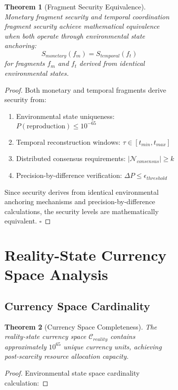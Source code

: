 \documentclass[12pt,a4paper]{article}
\newtheorem{theorem}{Theorem}
\begin{document}
\begin{figure}[H]
\begin{figure}[H]
\begin{theorem}[Fragment Security Equivalence]
Monetary fragment security and temporal coordination fragment security achieve mathematical equivalence when both operate through environmental state anchoring:
\begin{equation}
S_{monetary}(f_m) = S_{temporal}(f_t)
\end{equation}
for fragments $f_m$ and $f_t$ derived from identical environmental states.
\end{theorem}

\begin{proof}
Both monetary and temporal fragments derive security from:
\begin{enumerate}
\item Environmental state uniqueness: $P(\text{reproduction}) \leq 10^{-65}$
\item Temporal reconstruction windows: $\tau \in [t_{min}, t_{max}]$
\item Distributed consensus requirements: $|\mathcal{N}_{consensus}| \geq k$
\item Precision-by-difference verification: $\Delta P \leq \epsilon_{threshold}$
\end{enumerate}

Since security derives from identical environmental anchoring mechanisms and precision-by-difference calculations, the security levels are mathematically equivalent. $\square$
\end{proof}

\section{Reality-State Currency Space Analysis}

\subsection{Currency Space Cardinality}

\begin{theorem}[Currency Space Completeness]
The reality-state currency space $\mathcal{C}_{reality}$ contains approximately $10^{65}$ unique currency units, achieving post-scarcity resource allocation capacity.
\end{theorem}

\begin{proof}
Environmental state space cardinality calculation:


\end{proof}
\end{figure}
\end{figure}
\end{document}
